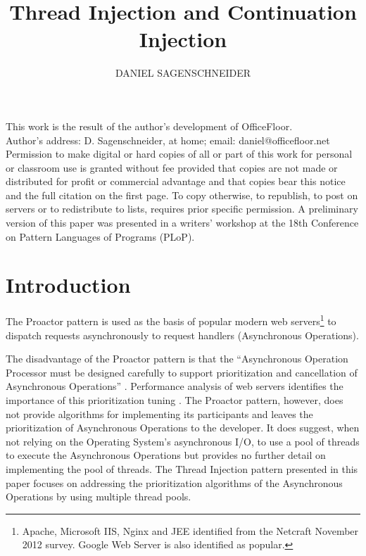 \documentclass[prodmode]{style/acmlarge}
\title{Thread Injection and Continuation Injection}
\author{DANIEL SAGENSCHNEIDER \affil{daniel@officefloor.net}}
\begin{document}
\begin{bottomstuff}
This work is the result of the author's development of OfficeFloor.\\
Author's address: D. Sagenschneider, at home; email: daniel@officefloor.net\\

Permission to make digital or hard copies of all or part of this work for
personal or classroom use is granted without fee provided that copies are not
made or distributed for profit or commercial advantage and that copies bear this
notice and the full citation on the first page. To copy otherwise, to republish,
to post on servers or to redistribute to lists, requires prior specific
permission. A preliminary version of this paper was presented in a writers'
workshop at the 18th Conference on Pattern Languages of Programs (PLoP).
\end{bottomstuff}

\maketitle

\section{Introduction}

The Proactor pattern \cite{proactor} is used as the basis of popular modern web
servers\footnote{Apache, Microsoft IIS, Nginx and JEE identified from the
Netcraft November 2012 survey.  Google Web Server is also identified as
popular.} to dispatch requests asynchronously to request handlers (Asynchronous
Operations).

The disadvantage of the Proactor pattern is that the ``Asynchronous Operation
Processor must be designed carefully to support prioritization and cancellation
of Asynchronous Operations'' \cite[p. 8]{proactor}.  Performance analysis of web
servers identifies the importance of this prioritization tuning
\cite{tuning-important,low-server-footprint,tuning-os-important}. The Proactor
pattern, however, does not provide algorithms for implementing its participants
and leaves the prioritization of Asynchronous Operations to the developer.  It
does suggest, when not relying on the Operating System's asynchronous I/O, to
use a pool of threads to execute the Asynchronous Operations but provides no
further detail on implementing the pool of threads.  The Thread Injection
pattern presented in this paper focuses on addressing the prioritization
algorithms of the Asynchronous Operations by using multiple thread pools.
\end{document}
